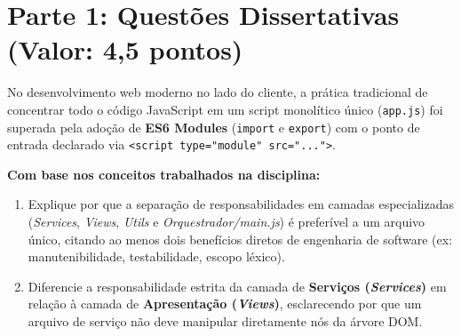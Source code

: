 \vspace{0.2cm}

\section*{Parte 1: Questões Dissertativas (Valor: 4,5 pontos)}

\begin{tcolorbox}[colback=azulTitulo!4, colframe=azulTitulo, title=\textbf{Questão 1: Arquitetura Modular no Frontend (ES6 Modules) [Valor: 1,5 ponto]}]
    No desenvolvimento web moderno no lado do cliente, a prática tradicional de concentrar todo o código JavaScript em um script monolítico único (\texttt{app.js}) foi superada pela adoção de \textbf{ES6 Modules} (\texttt{import} e \texttt{export}) com o ponto de entrada declarado via \texttt{<script type="module" src="...">}.

    \textbf{Com base nos conceitos trabalhados na disciplina:}
    \begin{enumerate}[label=\alph*)]
        \item Explique por que a separação de responsabilidades em camadas especializadas (\textit{Services}, \textit{Views}, \textit{Utils} e \textit{Orquestrador/main.js}) é preferível a um arquivo único, citando ao menos dois benefícios diretos de engenharia de software (ex: manutenibilidade, testabilidade, escopo léxico).
        \item Diferencie a responsabilidade estrita da camada de \textbf{Serviços (\textit{Services})} em relação à camada de \textbf{Apresentação (\textit{Views})}, esclarecendo por que um arquivo de serviço não deve manipular diretamente nós da árvore DOM.
    \end{enumerate}


\end{tcolorbox}
